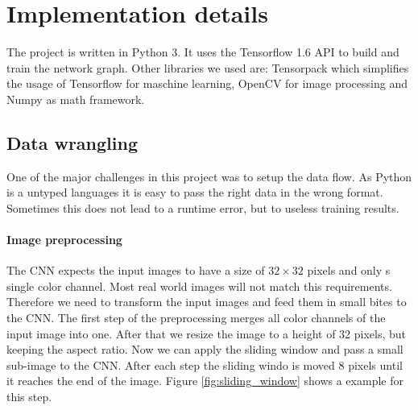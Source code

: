 \documentclass{utue} %
\begin{document}
\section{Implementation details}
The project is written in Python 3. It uses the Tensorflow 1.6 API to build and train the network graph. Other libraries we used are: Tensorpack which simplifies the usage of Tensorflow for maschine learning, OpenCV for image processing and Numpy as math framework.

\subsection{Data wrangling}
One of the major challenges in this project was to setup the data flow. As Python is a untyped languages it is easy to pass the right data in the wrong format. Sometimes this does not lead to a runtime error, but to useless training results.

\paragraph{Image preprocessing}
The CNN expects the input images to have a size of $32\times32$ pixels and only s single color channel. Most real world images will not match this requirements. Therefore we need to transform the input images and feed them in small bites to the CNN. The first step of the preprocessing merges all color channels of the input image into one. After that we resize the image to a height of 32 pixels, but keeping the aspect ratio. Now we can apply the sliding window and pass a small sub-image to the CNN. After each step the sliding windo is moved 8 pixels until it reaches the end of the image. Figure \ref{fig:sliding_window} shows a example for this step.
\end{document}
